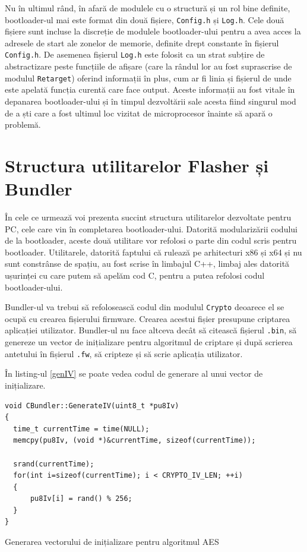 \documentclass[12pt,a4paper,titlepage]{report}
\begin{document}
Nu în ultimul rând, în afară de modulele cu o structură și un rol bine definite, bootloader-ul mai este format din două fișiere, \texttt{Config.h} și \texttt{Log.h}. Cele două fișiere sunt incluse la discreție de modulele bootloader-ului pentru a avea acces la adresele de start ale zonelor de memorie, definite drept constante în fișierul \texttt{Config.h}. De asemenea fișierul \texttt{Log.h} este folosit ca un strat subțire de abstractizare peste funcțiile de afișare (care la rândul lor au fost suprascrise de modulul \texttt{Retarget}) oferind informații în plus, cum ar fi linia și fișierul de unde este apelată funcția curentă care face output. Aceste informații au fost vitale în depanarea bootloader-ului și în timpul dezvoltării sale acesta fiind singurul mod de a ști care a fost ultimul loc vizitat de microprocesor înainte să apară o problemă.

\section{Structura utilitarelor Flasher și Bundler}
În cele ce urmează voi prezenta succint structura utilitarelor dezvoltate pentru PC, cele care vin în completarea bootloader-ului. Datorită modularizării codului de la bootloader, aceste două utilitare vor refolosi o parte din codul scris pentru bootloader. Utilitarele, datorită faptului că rulează pe arhitecturi x86 și x64 și nu sunt constrânse de spațiu, au fost scrise în limbajul C++, limbaj ales datorită ușurinței cu care putem să apelăm cod C, pentru a putea refolosi codul bootloader-ului.

Bundler-ul va trebui să refolosească codul din modulul \texttt{Crypto} deoarece el se ocupă cu crearea fișierului firmware. Crearea acestui fișier presupune criptarea aplicației utilizator. Bundler-ul nu face altceva decât să citească fișierul \texttt{.bin}, să genereze un vector de inițializare pentru algoritmul de criptare și după scrierea antetului în fișierul \texttt{.fw}, să cripteze și să scrie aplicația utilizator.

În listing-ul \ref{genIV} se poate vedea codul de generare al unui vector de inițializare.

\begin{listing}[h]
\begin{verbatim}
void CBundler::GenerateIV(uint8_t *pu8Iv)
{
  time_t currentTime = time(NULL);
  memcpy(pu8Iv, (void *)&currentTime, sizeof(currentTime));

  srand(currentTime);
  for(int i=sizeof(currentTime); i < CRYPTO_IV_LEN; ++i)
  {
      pu8Iv[i] = rand() % 256;
  }
}
\end{verbatim}

\caption{Generarea vectorului de inițializare pentru algoritmul AES}
\label{genIV}
\end{listing}
\end{document}
